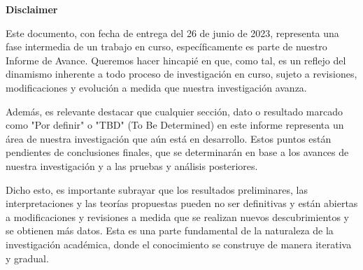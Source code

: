 \newpage
{\huge\bfseries \space Disclaimer}
\bigskip
\bigskip

Este documento, con fecha de entrega del 26 de junio de 2023, representa una fase intermedia de un trabajo en curso, específicamente es parte de nuestro Informe de Avance. Queremos hacer hincapié en que, como tal, es un reflejo del dinamismo inherente a todo proceso de investigación en curso, sujeto a revisiones, modificaciones y evolución a medida que nuestra investigación avanza.

Además, es relevante destacar que cualquier sección, dato o resultado marcado como "Por definir" o "TBD" (To Be Determined) en este informe representa un área de nuestra investigación que aún está en desarrollo. Estos puntos están pendientes de conclusiones finales, que se determinarán en base a los avances de nuestra investigación y a las pruebas y análisis posteriores.

Dicho esto, es importante subrayar que los resultados preliminares, las interpretaciones y las teorías propuestas pueden no ser definitivas y están abiertas a modificaciones y revisiones a medida que se realizan nuevos descubrimientos y se obtienen más datos. Esta es una parte fundamental de la naturaleza de la investigación académica, donde el conocimiento se construye de manera iterativa y gradual.

\bigskip
\bigskip
\bigskip